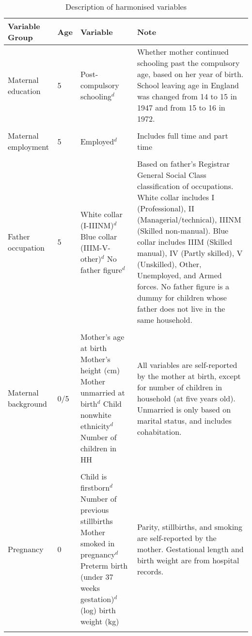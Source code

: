 \begin{landscape}
\begin{table}[ht!]
\caption{Description of harmonised variables}\label{tab:harmvar}
\centering{} \footnotesize
\begin{tabular}{L{.2\textwidth}C{.1\textwidth}L{.3\textwidth}L{.7\textwidth}}
\toprule
Variable Group & Age & Variable & Note \\
\midrule
Maternal education & 5 & Post-compulsory schooling$^d$ & Whether mother continued schooling past the compulsory age, based on her year of birth. School leaving age in England was changed from 14 to 15 in 1947 and from 15 to 16 in 1972. \\ \\[-1.5em]
Maternal employment & 5 & Employed$^d$ & Includes full time and part time \\ \\[-1.5em]
Father occupation & 5 & White collar (I-IIINM)$^d$ \newline Blue collar (IIIM-V-other)$^d$ \newline No father figure$^d$ & Based on father's Registrar General Social Class classification of occupations. White collar includes I (Professional), II (Managerial/technical), IIINM (Skilled non-manual). Blue collar includes IIIM (Skilled manual), IV (Partly skilled), V (Unskilled), Other, Unemployed, and Armed forces. No father figure is a dummy for children whose father does not live in the same household. \\ \\[-1.5em]
Maternal background & 0/5 & Mother's age at birth \newline Mother's height (cm) \newline Mother unmarried at birth$^d$ \newline Child nonwhite ethnicity$^d$  \newline Number of children in HH & All variables are self-reported by the mother at birth, except for number of children in household (at five years old). Unmarried is only based on marital status, and includes cohabitation. \\ \\[-1.5em]
Pregnancy & 0 & Child is firstborn$^d$ \newline Number of previous stillbirths \newline Mother smoked in pregnancy$^d$ \newline Preterm birth (under 37 weeks gestation)$^d$ \newline (log) birth weight (kg) & Parity, stillbirths, and smoking are self-reported by the mother. Gestational length and birth weight are from hospital records. \\ \\[-1.5em]

\end{tabular}
\end{table}
\end{landscape}
